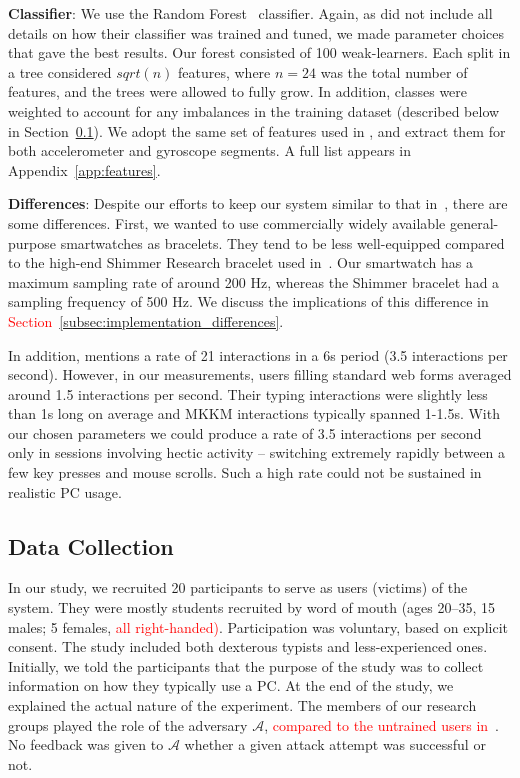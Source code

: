 \documentclass[conference]{IEEEtran}
\newcommand{\attacker}{$\mathcal{A}$\xspace}
\newcommand\changeOtto[1]{\textcolor{red}{#1}}
\newcommand\changeMika[1]{\textcolor{red}{#1}}
\newcommand\changeOtto[1]{{#1}}
\newcommand\changeMika[1]{{#1}}
\begin{document}
\vspace{1mm}
\noindent\textbf{Classifier}: We use the Random
Forest~\cite{breiman2001random} classifier. Again, as \cite{mare2014zebra} did not include all details on how their classifier was trained and tuned, we made parameter choices that gave the best results. Our forest consisted of 100 weak-learners. Each split in a tree considered $sqrt(n)$ features, where $n=24$ was the total number of features, and the trees were allowed to fully grow. In addition, classes were weighted to account for any imbalances in the training dataset (described below in Section~\ref{sec:victim-data}).
We adopt the same set of features used in \cite{mare2014zebra}, and extract them for both accelerometer and gyroscope segments. A full list appears in Appendix~\ref{app:features}.


\noindent\textbf{Differences}: Despite our efforts to keep our system similar to that in~\cite{mare2014zebra}, there are some differences. First, we wanted to use commercially widely available general-purpose smartwatches as bracelets. They tend to be less well-equipped compared to the high-end Shimmer Research bracelet used in~\cite{mare2014zebra}. Our smartwatch has a maximum sampling rate of around 200 Hz, whereas the Shimmer bracelet had a sampling frequency of 500 Hz. We discuss the implications of this difference in \changeMika{Section~\ref{subsec:implementation_differences}}.

In addition, \cite{mare2014zebra} mentions a rate of 21 interactions in a 6s period (3.5 interactions per second). However, in our measurements, users filling standard web forms averaged around 1.5 interactions per second. Their typing interactions were slightly less than 1s long on average and MKKM interactions typically spanned 1-1.5s. With our chosen parameters we could produce a rate of 3.5 interactions per second only in sessions involving hectic activity -- switching extremely rapidly between a few key presses and mouse scrolls. Such a high rate could not be sustained in realistic PC usage.




\subsection{Data Collection}
\label{sec:victim-data}

In our study, we recruited 20 participants to serve as users (victims) of the system.
They were mostly students recruited by word of mouth (ages 20--35, 15 males; 5
females, \changeMika{all right-handed)}. 
Participation was voluntary, based on explicit consent. 
The study included both dexterous typists and less-experienced ones.
Initially, we
told the participants that the purpose of the study was to collect information
on how they typically use a PC. At the end of the study, we explained the actual nature of the experiment. The members of our research groups played the role of the adversary \attacker, \changeOtto{compared to the untrained users in~\cite{mare2014zebra}}.
No feedback was given to \attacker whether a given attack attempt was successful or not.
\end{document}
